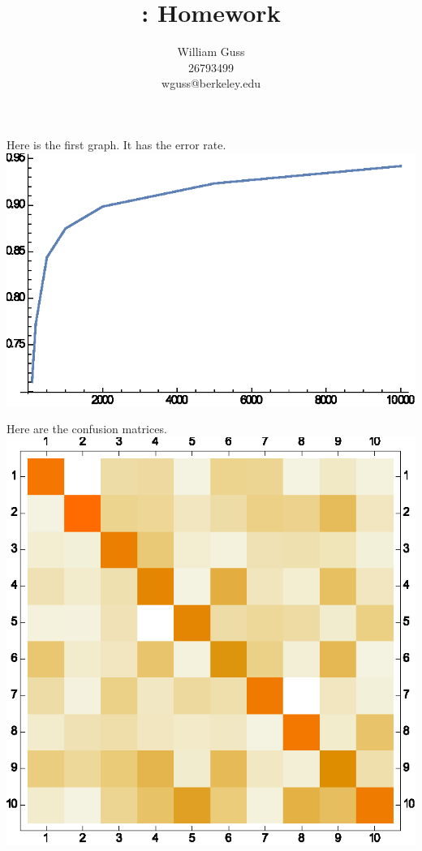 \documentclass[letter]{article}
\title{\bCLASS: Homework \bHWN}
\author{William Guss\\26793499\\wguss@berkeley.edu}
\begin{document}
\maketitle
\thispagestyle{empty}


Here is the first graph. It has the error rate. \\
\includegraphics{GRAPHS_gr1.eps}

Here are the confusion matrices.\\
\includegraphics{GRAPHS_gr2.eps}
\end{document}
